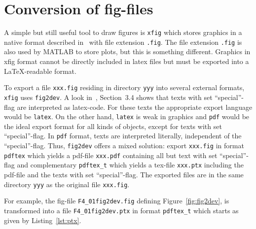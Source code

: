 \section{Conversion of fig-files}\label{sec:fig2dev}



A simple but still useful tool to draw figures is \texttt{xfig} 
which stores graphics in a native format 
described in~\cite{XFigF} with file extension \texttt{.fig}. 
The file extension \texttt{.fig} is also used by MATLAB to store plots, 
but this is something different. 
Graphics in xfig format cannot be directly included in latex files 
but must be exported into a \LaTeX-readable format. 

To export a file \texttt{xxx.fig} residing in directory \texttt{yyy} 
into several external formats, 
\texttt{xfig} uses \texttt{fig2dev}. 
A look in~\cite{XFigF}, Section~3.4 shows that texts with set ``special''-flag 
are interpreted as latex-code. 
For these texts the appropriate export language would be \texttt{latex}. 
On the other hand, \texttt{latex} is weak in graphics 
and \texttt{pdf} would be the ideal export format for all kinds of objects, 
except for texts with set ``special''-flag. 
In \texttt{pdf} format, texts are interpreted literally, 
independent of the ``special''-flag. 
Thus, \texttt{fig2dev} offers a mixed solution: 
export \texttt{xxx.fig} in format \texttt{pdftex} which yields a pdf-file 
\texttt{xxx.pdf} containing all but text with set ``special''-flag 
and complementary \texttt{pdftex\_t} which yields a tex-file \texttt{xxx.ptx} 
including the pdf-file and the texts with set ``special''-flag. %
The exported files are in the same directory \texttt{yyy} 
as the original file \texttt{xxx.fig}. 

For example, 
the fig-file \texttt{F4\_01fig2dev.fig} defining Figure~\ref{fig:fig2dev}, 
is transformed into a file \texttt{F4\_01fig2dev.ptx} 
in format \texttt{pdftex\_t} which starts as given by Listing~\ref{lst:ptx}. 



